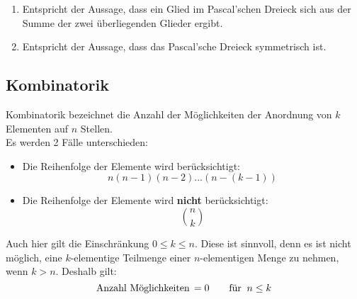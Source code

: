 \documentclass[../MAIN/main.tex]{subfiles}
\begin{document}
\begin{Bemerkung}
  \begin{enumerate}
    \item Entspricht der Aussage, dass ein Glied im Pascal'schen Dreieck sich aus der Summe der zwei überliegenden Glieder ergibt.
    \item Entspricht der Aussage, dass das Pascal'sche Dreieck symmetrisch ist.
  \end{enumerate}
\end{Bemerkung}


\subsection{Kombinatorik}
\begin{Theorem}
  Kombinatorik bezeichnet die Anzahl der Möglichkeiten der Anordnung von $k$ Elementen auf $n$ Stellen.\\
  Es werden 2 Fälle unterschieden:\\
  \begin{itemize}
    \item Die Reihenfolge der Elemente wird berücksichtigt:
          $$n(n-1)(n-2)...(n-(k-1))$$
    \item Die Reihenfolge der Elemente wird \textbf{nicht} berücksichtigt:
          $${n\choose k}$$
  \end{itemize}
\end{Theorem}
\begin{Bemerkung}
  Auch hier gilt die Einschränkung $0 \leq k \leq n$. Diese ist sinnvoll, denn es ist nicht möglich, eine $k$-elementige Teilmenge einer $n$-elementigen Menge zu nehmen, wenn $k > n$. Deshalb gilt:
  $$\text{Anzahl Möglichkeiten\,} = 0 \text{\qquad für \:} n \leq k $$
\end{Bemerkung}
\end{document}
